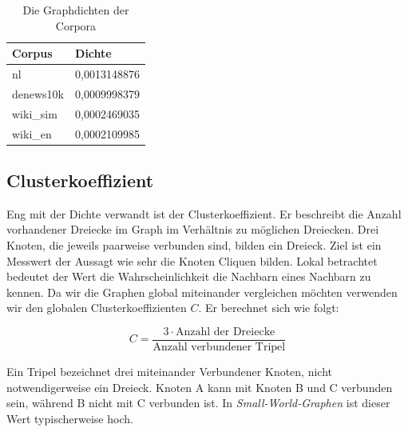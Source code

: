 \documentclass[11pt, a4paper]{article}
\begin{document}
\begin{table}[h]
  \centering
  \begin{tabular}{ll}
    \toprule
    Corpus            & Dichte          \\
    \midrule
    nl                &  		0,0013148876 \\
    denews10k         &  		0,0009998379 \\
    wiki\_sim         &  		0,0002469035 \\
    wiki\_en          &  		0,0002109985 \\
    \bottomrule
  \end{tabular}
  \caption{\label{density_table} Die Graphdichten der Corpora}
\end{table}

\subsection{Clusterkoeffizient}

Eng mit der Dichte verwandt ist der Clusterkoeffizient. Er beschreibt die
Anzahl vorhandener Dreiecke im Graph im Verhältnis zu möglichen Dreiecken. Drei
Knoten, die jeweils paarweise verbunden sind, bilden ein Dreieck. Ziel ist ein
Messwert der Aussagt wie sehr die Knoten Cliquen bilden. Lokal betrachtet
bedeutet der Wert die Wahrscheinlichkeit die Nachbarn eines Nachbarn zu kennen.
Da wir die Graphen global miteinander vergleichen möchten verwenden wir den
globalen Clusterkoeffizienten $C$. Er berechnet sich wie folgt:

$$
    C = \frac{3\cdot\text{Anzahl der Dreiecke}}{\text{Anzahl verbundener Tripel}}
$$

Ein Tripel bezeichnet drei miteinander Verbundener Knoten, nicht
notwendigerweise ein Dreieck. Knoten A kann mit Knoten B und C verbunden sein,
während B nicht mit C verbunden ist. In \emph{Small-World-Graphen} ist dieser
Wert typischerweise hoch. 



\end{document}
